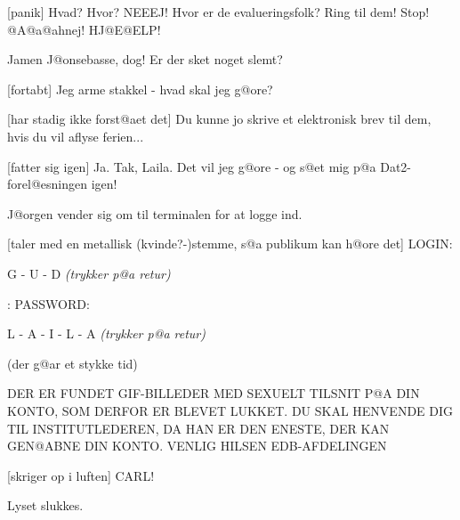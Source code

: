 \documentclass[a4paper,11pt]{article}
\begin{document}
\begin{sketch}
[panik] Hvad? Hvor? NEEEJ! Hvor er de
evalueringsfolk? Ring til dem! Stop! @A@a@ahnej! HJ@E@ELP!

 Jamen J@onsebasse, dog! Er der sket noget slemt?

[fortabt] Jeg arme stakkel - hvad skal jeg g@ore?

[har stadig ikke forst@aet det] Du kunne jo skrive et
elektronisk brev til dem, hvis du vil aflyse ferien...

[fatter sig igen] Ja. Tak, Laila. Det vil jeg g@ore
- og s@et mig p@a Dat2-forel@esningen igen!

\scene J@orgen vender sig om til terminalen for at logge ind.

[taler med en metallisk (kvinde?-)stemme, s@a
publikum kan h@ore det] {\sf LOGIN:}

 G - U - D {\em (trykker p@a retur)}

: {\sf PASSWORD:}

 L - A - I - L - A {\em (trykker p@a retur)}

\scene (der g@ar et stykke tid)

 {\sf DER ER FUNDET GIF-BILLEDER MED SEXUELT TILSNIT P@A DIN
KONTO, SOM DERFOR ER BLEVET LUKKET. DU SKAL HENVENDE DIG TIL
INSTITUTLEDEREN, DA HAN ER DEN ENESTE, DER KAN GEN@ABNE DIN KONTO.
VENLIG HILSEN EDB-AFDELINGEN}

[skriger op i luften] CARL!

\scene Lyset slukkes.

\end{sketch}
\end{document}
